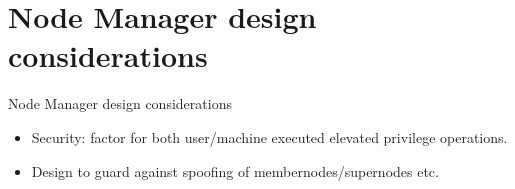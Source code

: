 \documentclass{beamer}
\begin{document}
\section{Node Manager design considerations}
\begin{frame}{Node Manager design considerations}
\begin{itemize}
\item Security: factor for both user/machine executed elevated privilege operations.
\item Design to guard against spoofing of membernodes/supernodes etc.
\end{itemize}
\end{frame}
\end{document}
